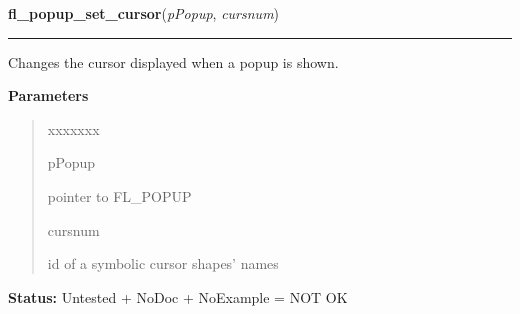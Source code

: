 \hspace{.8\funcindent}\begin{boxedminipage}{\funcwidth}

    \raggedright \textbf{fl\_popup\_set\_cursor}(\textit{pPopup}, \textit{cursnum})

    \vspace{-1.5ex}

    \rule{\textwidth}{0.5\fboxrule}
\setlength{\parskip}{2ex}
    Changes the cursor displayed when a popup is shown.

\setlength{\parskip}{1ex}
      \textbf{Parameters}
      \vspace{-1ex}

      \begin{quote}
        \begin{Ventry}{xxxxxxx}

          \item[pPopup]

          pointer to FL\_POPUP

          \item[cursnum]

          id of a symbolic cursor shapes' names

        \end{Ventry}

      \end{quote}

\textbf{Status:} Untested + NoDoc + NoExample = NOT OK



    \end{boxedminipage}

    \label{xformslib:library:fl_popup_get_title}

    \vspace{0.5ex}

